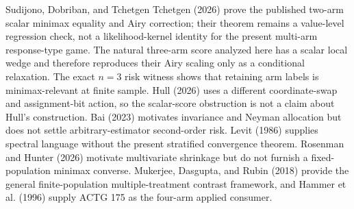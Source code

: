 Sudijono, Dobriban, and Tchetgen Tchetgen (2026) prove the published two-arm scalar minimax equality and Airy correction; their theorem remains a value-level regression check, not a likelihood-kernel identity for the present multi-arm response-type game.  The natural three-arm score analyzed here has a scalar local wedge and therefore reproduces their Airy scaling only as a conditional relaxation.  The exact \(n=3\) risk witness shows that retaining arm labels is minimax-relevant at finite sample.  Hull (2026) uses a different coordinate-swap and assignment-bit action, so the scalar-score obstruction is not a claim about Hull's construction.  Bai (2023) motivates invariance and Neyman allocation but does not settle arbitrary-estimator second-order risk.  Levit (1986) supplies spectral language without the present stratified convergence theorem.  Rosenman and Hunter (2026) motivate multivariate shrinkage but do not furnish a fixed-population minimax converse.  Mukerjee, Dasgupta, and Rubin (2018) provide the general finite-population multiple-treatment contrast framework, and Hammer et al. (1996) supply ACTG 175 as the four-arm applied consumer.